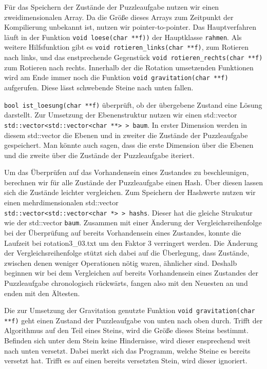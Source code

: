 	Für das Speichern der Zustände der Puzzleaufgabe nutzen wir einen zweidimensionalen Array. 
	Da die Größe dieses Arrays zum Zeitpunkt der Kompilierung unbekannt ist, nutzen wir pointer-to-pointer.
	Das Hauptverfahren läuft in der Funktion \texttt{void loese(char **f))} der Hauptklasse \texttt{rahmen}.
  Als weitere Hilfsfunktion gibt es \texttt{void rotieren\_links(char **f)}, zum Rotieren nach links, 
	und das enstprechende Gegenstück \texttt{void rotieren\_rechts(char **f)} zum Rotieren nach rechts.
	Innerhalb der die Rotation umsetzenden Funktionen wird am Ende immer noch die Funktion \texttt{void gravitation(char **f)} aufgerufen.
	Diese lässt schwebende Steine nach unten fallen. 
	
	\texttt{bool ist\_loesung(char **f)} überprüft, ob der übergebene Zustand eine Lösung darstellt.
	Zur Umsetzung der Ebenenstruktur nutzen wir einen std::vector \\\texttt{std::vector<std::vector<char **> > baum}.
	In erster Dimension werden in diesem std::vector die Ebenen und in zweiter die Zustände der Puzzleaufgabe gespeichert. 
	Man könnte auch sagen, dass die erste Dimension über die Ebenen und die zweite über die Zustände der Puzzleaufgabe iteriert.

	Um das Überprüfen auf das Vorhandensein eines Zustandes zu beschleunigen, berechnen wir für alle Zustände der Puzzleaufgabe einen Hash.
	Über diesen lassen sich  die Zustände leichter vergleichen. Zum Speichern der Hashwerte nutzen 
	wir einen mehrdimensionalen std::vector \\\texttt{std::vector<std::vector<char *> > hashs}. Dieser hat die gleiche Strukutur wie der std::vector \texttt{baum}.
	 Zusammen mit einer Änderung der Vergleichsreihenfolge
	bei der Überprüfung auf bereits Vorhandensein eines Zustandes, konnte die Laufzeit bei rotation3\_03.txt um den Faktor 3 verringert werden.
	Die Änderung der Vergleichsreihenfolge stützt sich dabei auf die Überlegung, dass Zustände, zwischen denen weniger Operationen nötig waren, ähnlicher sind.
	Deshalb beginnen wir bei dem Vergleichen auf bereits Vorhandensein eines Zustandes der Puzzleaufgabe chronologisch rückwärts, 
	fangen also mit den Neuesten an und enden mit den Ältesten.

	Die zur Umsetzung der Gravitation genutzte Funktion \texttt{void gravitation(char **f)} geht einen Zustand der Puzzleaufgabe von unten nach oben durch.
	Trifft der Algorithmus auf den Teil eines Steins, wird die Größe dieses Steins bestimmt. Befinden sich unter dem Stein keine Hindernisse, 
	wird dieser ensprechend weit nach unten versetzt. Dabei merkt sich das Programm, welche Steine es bereits versetzt hat. 
	Trifft es auf einen bereits versetzten Stein, wird dieser ignoriert.

 
	
	
